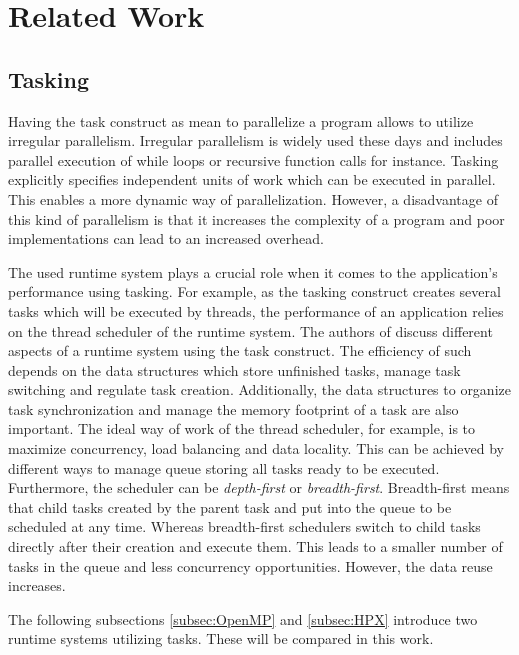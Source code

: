 \section{Related Work}

\subsection{Tasking}
\label{subsec:Tasking}
  Having the task construct as mean to parallelize a program allows to utilize irregular parallelism.
  Irregular parallelism is widely used these days and includes parallel execution of while loops or recursive function calls for instance.
  Tasking explicitly specifies independent units of work which can be executed in parallel.
  This enables a more dynamic way of parallelization.
  However, a disadvantage of this kind of parallelism is that it increases the complexity of a program and poor implementations can lead to an increased overhead.~\cite{Ayguade.2009}~\cite{LaGrone.2011}
  
  
  The used runtime system plays a crucial role when it comes to the application's performance using tasking. 
  For example, as the tasking construct creates several tasks which will be executed by threads, the performance of an application relies on the thread scheduler of the runtime system.
  The authors of \cite{LaGrone.2011} discuss different aspects of a runtime system using the task construct.
  The efficiency of such depends on the data structures which store unfinished tasks, manage task switching and regulate task creation.
  Additionally, the data structures to organize task synchronization and manage the memory footprint of a task are also important.
  The ideal way of work of the thread scheduler, for example, is to maximize concurrency, load balancing and data locality.
  This can be achieved by different ways to manage queue storing all tasks ready to be executed.
  Furthermore, the scheduler can be \textit{depth-first} or \textit{breadth-first}.
  Breadth-first means that child tasks created by the parent task and put into the queue to be scheduled at any time.
  Whereas breadth-first schedulers switch to child tasks directly after their creation and execute them.
  This leads to a smaller number of tasks in the queue and less concurrency opportunities.
  However, the data reuse increases.
 
 	
  The following subsections \ref{subsec:OpenMP} and \ref{subsec:HPX} introduce two runtime systems utilizing tasks.
  These will be compared in this work.


